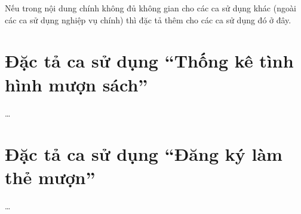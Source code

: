 \documentclass[../DoAn.tex]{subfiles}
\begin{document}
Nếu trong nội dung chính không đủ không gian cho các ca sử dụng khác (ngoài các ca sử dụng nghiệp vụ chính) thì đặc tả thêm cho các ca sử dụng đó ở đây.

\section{Đặc tả ca sử dụng ``Thống kê tình hình mượn sách''}
\ldots

\section{Đặc tả ca sử dụng ``Đăng ký làm thẻ mượn''}
\ldots
\end{document}

